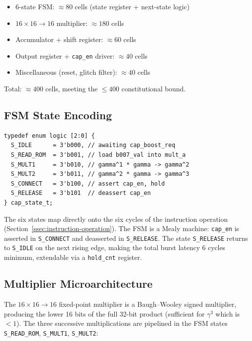 \documentclass[12pt,a4paper]{report}
\theoremstyle{plain}
\theoremstyle{definition}
\theoremstyle{remark}
\begin{document}
\begin{itemize}[leftmargin=1.5em]
  \item 6-state FSM: $\approx 80$ cells (state register + next-state logic)
  \item $16 \times 16 \to 16$ multiplier: $\approx 180$ cells
  \item Accumulator + shift register: $\approx 60$ cells
  \item Output register + \texttt{cap\_en} driver: $\approx 40$ cells
  \item Miscellaneous (reset, glitch filter): $\approx 40$ cells
\end{itemize}

Total: $\approx 400$ cells, meeting the $\leq 400$ constitutional bound.

\subsection{FSM State Encoding}
\label{ssec:fsm-states}

\begin{lstlisting}[style=verilog,caption={FSM state encoding in \texttt{cap\_boost\_controller.sv}}]
typedef enum logic [2:0] {
  S_IDLE      = 3'b000, // awaiting cap_boost_req
  S_READ_ROM  = 3'b001, // load b007_val into mult_a
  S_MULT1     = 3'b010, // gamma^1 * gamma -> gamma^2
  S_MULT2     = 3'b011, // gamma^2 * gamma -> gamma^3
  S_CONNECT   = 3'b100, // assert cap_en, hold
  S_RELEASE   = 3'b101  // deassert cap_en
} cap_state_t;
\end{lstlisting}

The six states map directly onto the six cycles of the instruction
operation (Section~\ref{ssec:instruction-operation}).
The FSM is a Mealy machine: \texttt{cap\_en} is asserted in \texttt{S\_CONNECT}
and deasserted in \texttt{S\_RELEASE}.
The state \texttt{S\_RELEASE} returns to \texttt{S\_IDLE} on the next
rising edge, making the total burst latency 6 cycles minimum,
extendable via a \texttt{hold\_cnt} register.

\subsection{Multiplier Microarchitecture}
\label{ssec:multiplier}

The $16 \times 16 \to 16$ fixed-point multiplier is a Baugh--Wooley
signed multiplier, producing the lower 16 bits of the full 32-bit product
(sufficient for $\gamma^{3}$ which is $< 1$).
The three successive multiplications are pipelined in the FSM states
\texttt{S\_READ\_ROM}, \texttt{S\_MULT1}, \texttt{S\_MULT2}:
\end{document}
